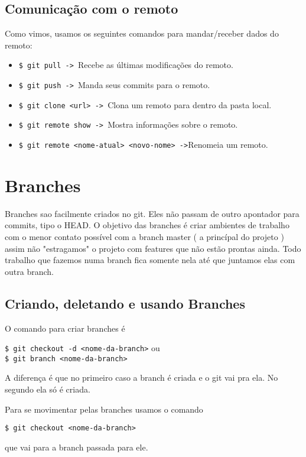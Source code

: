 \documentclass{article}
\begin{document}
\subsection{Comunicação com o remoto}
    Como vimos, usamos os seguintes comandos para mandar/receber dados do remoto:
    \begin{itemize}
        \item \verb#$ git pull -> #Recebe as últimas modificações do remoto.
        \item \verb#$ git push -> #Manda seus commits para o remoto.
        \item \verb#$ git clone <url> -> #Clona um remoto para dentro da pasta local.
        \item \verb#$ git remote show -> #Mostra informações sobre o remoto.
        \item \verb#$ git remote <nome-atual> <novo-nome> ->#Renomeia um remoto.
    \end{itemize}

\section{Branches}
    Branches sao facilmente criados no git. Eles não passam de outro apontador para 
commits, tipo o HEAD. O objetivo das branches é criar ambientes de trabalho com o
menor contato possível com a branch master ( a princípal do projeto ) assim
não "estragamos" o projeto com features que não estão prontas ainda. Todo trabalho
que fazemos numa branch fica somente nela até que juntamos elas com outra branch.

\subsection{Criando, deletando e usando Branches}
    O comando para criar branches é
\begin{tabbing}
    \hspace{1cm}\=\verb#$ git checkout -d <nome-da-branch># ou\\
                \>\verb#$ git branch <nome-da-branch>#
\end{tabbing}
    A diferença é que no primeiro caso a branch é criada e o git vai pra ela. No segundo
ela só é criada.

    Para se movimentar pelas branches usamos o comando
\begin{tabbing}
    \hspace{1cm}\=\verb#$ git checkout <nome-da-branch>#
\end{tabbing}
    que vai para a branch passada para ele.
\end{document}
